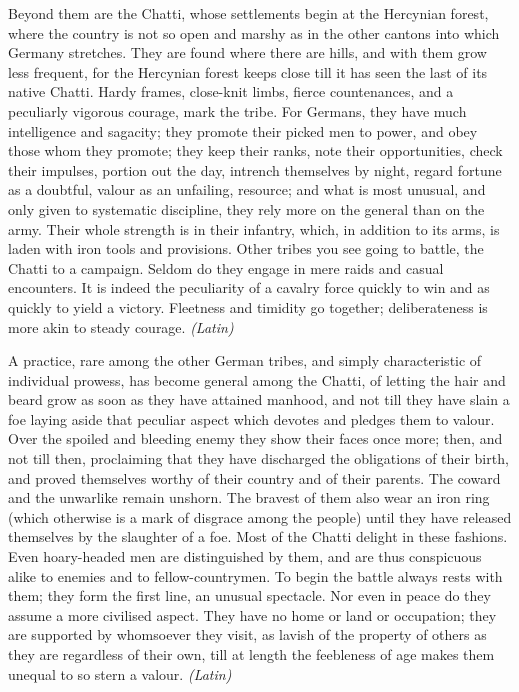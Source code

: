 
Beyond them are the Chatti, whose settlements begin at the Hercynian forest, where the country is not so open and marshy as in the other cantons into which Germany stretches. They are found where there are hills, and with them grow less frequent, for the Hercynian forest keeps close till it has seen the last of its native Chatti. Hardy frames, close-knit limbs, fierce countenances, and a peculiarly vigorous courage, mark the tribe. For Germans, they have much intelligence and sagacity; they promote their picked men to power, and obey those whom they promote; they keep their ranks, note their opportunities, check their impulses, portion out the day, intrench themselves by night, regard fortune as a doubtful, valour as an unfailing, resource; and what is most unusual, and only given to systematic discipline, they rely more on the general than on the army. Their whole strength is in their infantry, which, in addition to its arms, is laden with iron tools and provisions. Other tribes you see going to battle, the Chatti to a campaign. Seldom do they engage in mere raids and casual encounters. It is indeed the peculiarity of a cavalry force quickly to win and as quickly to yield a victory. Fleetness and timidity go together; deliberateness is more akin to steady courage. \emph{(Latin)}


A practice, rare among the other German tribes, and simply characteristic of individual prowess, has become general among the Chatti, of letting the hair and beard grow as soon as they have attained manhood, and not till they have slain a foe laying aside that peculiar aspect which devotes and pledges them to valour. Over the spoiled and bleeding enemy they show their faces once more; then, and not till then, proclaiming that they have discharged the obligations of their birth, and proved themselves worthy of their country and of their parents. The coward and the unwarlike remain unshorn. The bravest of them also wear an iron ring (which otherwise is a mark of disgrace among the people) until they have released themselves by the slaughter of a foe. Most of the Chatti delight in these fashions. Even hoary-headed men are distinguished by them, and are thus conspicuous alike to enemies and to fellow-countrymen. To begin the battle always rests with them; they form the first line, an unusual spectacle. Nor even in peace do they assume a more civilised aspect. They have no home or land or occupation; they are supported by whomsoever they visit, as lavish of the property of others as they are regardless of their own, till at length the feebleness of age makes them unequal to so stern a valour. \emph{(Latin)}

